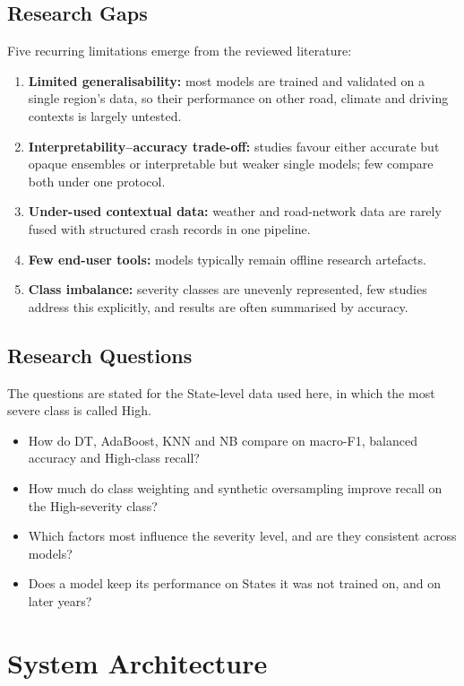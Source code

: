 \documentclass[conference]{IEEEtran}
\begin{document}
\subsection{Research Gaps}
Five recurring limitations emerge from the reviewed literature:
\begin{enumerate}
\item \textbf{Limited generalisability:} most models are trained and validated on a single region's data, so their performance on other road, climate and driving contexts is largely untested.
\item \textbf{Interpretability--accuracy trade-off:} studies favour either accurate but opaque ensembles or interpretable but weaker single models; few compare both under one protocol.
\item \textbf{Under-used contextual data:} weather and road-network data are rarely fused with structured crash records in one pipeline.
\item \textbf{Few end-user tools:} models typically remain offline research artefacts.
\item \textbf{Class imbalance:} severity classes are unevenly represented, few studies address this explicitly, and results are often summarised by accuracy.
\end{enumerate}

\subsection{Research Questions}
The questions are stated for the State-level data used here, in which the most severe class is called High.
\begin{itemize}
\item[RQ1] How do DT, AdaBoost, KNN and NB compare on macro-F1, balanced accuracy and High-class recall?
\item[RQ2] How much do class weighting and synthetic oversampling improve recall on the High-severity class?
\item[RQ3] Which factors most influence the severity level, and are they consistent across models?
\item[RQ4] Does a model keep its performance on States it was not trained on, and on later years?
\end{itemize}

\section{System Architecture}
\label{sec:architecture}
\end{document}
